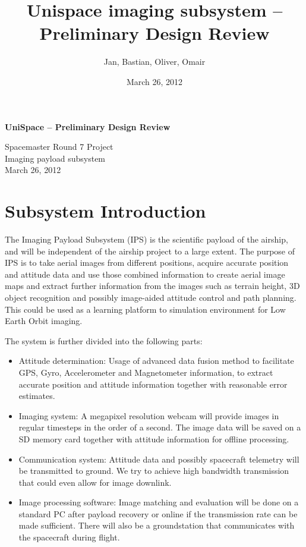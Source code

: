 \documentclass[fontsize=11pt,paper=a4,]{scrartcl}
\begin{document}
\sloppy
\thispagestyle{plain}
\begin{center}
\title{Unispace imaging subsystem -- Preliminary Design Review}
\author{Jan, Bastian, Oliver, Omair}
\date{March 26, 2012}


{\bf{\textsf{\huge UniSpace -- Preliminary Design Review}}}\\[\baselineskip]
\begin{Large}
Spacemaster Round 7 Project\\[\baselineskip]
Imaging payload subsystem\\
March 26, 2012\\
\end{Large}
\end{center}
\newpage

\tableofcontents
\newpage

\section{Subsystem Introduction}
The Imaging Payload Subsystem (IPS) is the scientific payload of the airship, and will be independent of the airship project to a large extent.
The purpose of IPS is to take aerial images from different positions, acquire accurate position and attitude data and use those combined information to create aerial image maps and extract further information from the images such as terrain height, 3D object recognition and possibly image-aided attitude control and path planning.
This could be used as a learning platform to simulation environment for Low Earth Orbit imaging.

The system is further divided into the following parts:
\begin{itemize}
\item Attitude determination: Usage of advanced data fusion method to facilitate GPS, Gyro, Accelerometer and Magnetometer information, to extract accurate position and attitude information together with reasonable error estimates.
\item Imaging system: A megapixel resolution webcam will provide images in regular timesteps in the order of a second.
The image data will be saved on a SD memory card together with attitude information for offline processing.
\item Communication system: Attitude data and possibly spacecraft telemetry will be transmitted to ground.
We try to achieve high bandwidth transmission that could even allow for image downlink.
\item Image processing software:
Image matching and evaluation will be done on a standard PC after payload recovery or online if the transmission rate can be made sufficient.
There will also be a groundstation that communicates with the spacecraft during flight.
\end{itemize}
\end{document}
